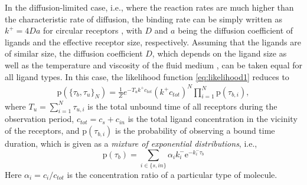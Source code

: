 \documentclass[twocolumn]{IEEEtran}
\newcommand{\p}{\mathrm{p}}
\newcommand{\e}{\mathrm{e}}
\begin{document}
In the diffusion-limited case, i.e., where the reaction rates are much higher than the characteristic rate of diffusion, the binding rate can be simply written as $k^+ = 4 D a$ for circular receptors \cite{mora2015physical}, with $D$ and $a$ being the diffusion coefficient of ligands and the effective receptor size, respectively. Assuming that the ligands are of similar size, the diffusion coefficient $D$, which depends on the ligand size as well as the temperature and viscosity of the fluid medium \cite{bialek2012biophysics}, can be taken equal for all ligand types. In this case, the likelihood function \eqref{eq:likelihood1} reduces to
\begin{align}
\p\left(\{\tau_b,\tau_u \}_{N}\right) = \frac{1}{Z} e^{- T_u  k^+ c_{tot}}  (k^+ c_{tot})^N \prod_{i=1}^{N} \p\left(\tau_{b,i}\right) ,
\label{eq:likelihood}
\end{align}
where $T_u = \sum_{i = 1}^N \tau_{u,i}$ is the total unbound time of all receptors during the observation period, $c_{tot} = c_s + c_{in}$ is the total ligand concentration in the vicinity of the receptors, and $\p(\tau_{b,i})$ is the probability of observing a bound time duration, which is given as a \textit{mixture of exponential distributions}, i.e.,  
%
\begin{equation}
\p(\tau_b)=  \sum_{i \in \{s, in\}} \alpha_i k_i^- \e^{-k_i^- \tau_b} \label{eq:probboundduration}
\end{equation}
Here $\alpha_i = c_i/c_{tot}$ is the concentration ratio of a particular type of molecule.
\end{document}
